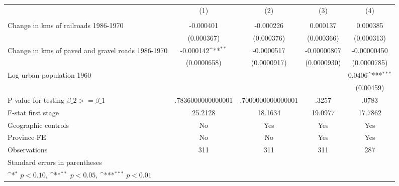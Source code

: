 {
\def\sym#1{\ifmmode^{#1}\else\(^{#1}\)\fi}
\begin{tabular}{l*{4}{c}}
\hline\hline
                &\multicolumn{1}{c}{(1)}&\multicolumn{1}{c}{(2)}&\multicolumn{1}{c}{(3)}&\multicolumn{1}{c}{(4)}\\
                &\multicolumn{1}{c}{}&\multicolumn{1}{c}{}&\multicolumn{1}{c}{}&\multicolumn{1}{c}{}\\
\hline
Change in kms of railroads 1986-1970&-0.000401         &-0.000226         & 0.000137         & 0.000385         \\
                &(0.000367)         &(0.000376)         &(0.000366)         &(0.000313)         \\
[1em]
Change in kms of paved and gravel roads 1986-1970&-0.000142\sym{**} &-0.0000517         &-0.00000807         &-0.00000450         \\
                &(0.0000658)         &(0.0000917)         &(0.0000930)         &(0.0000785)         \\
[1em]
Log urban population 1960&                  &                  &                  &   0.0406\sym{***}\\
                &                  &                  &                  &(0.00459)         \\
\hline
P-value for testing $\beta\_{2} >= \beta\_{1}$&.7836000000000001         &.7000000000000001         &    .3257         &    .0783         \\
F-stat first stage&  25.2128         &  18.1634         &  19.0977         &  17.7862         \\
Geographic controls&       No         &      Yes         &      Yes         &      Yes         \\
Province FE     &       No         &       No         &      Yes         &      Yes         \\
Observations    &      311         &      311         &      311         &      287         \\
\hline\hline
\multicolumn{5}{l}{\footnotesize Standard errors in parentheses}\\
\multicolumn{5}{l}{\footnotesize \sym{*} \(p<0.10\), \sym{**} \(p<0.05\), \sym{***} \(p<0.01\)}\\
\end{tabular}
}
